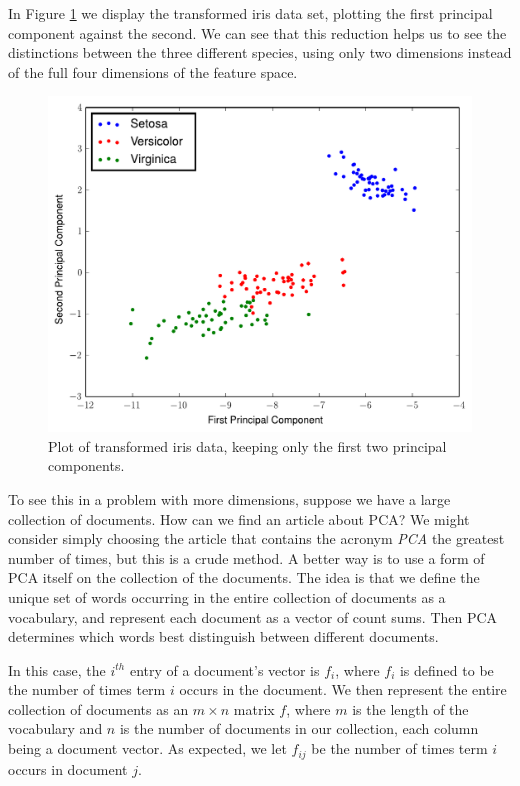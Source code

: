 In Figure \ref{fig:iris_pca} we display the transformed iris data set, plotting the first principal component against the second. We can see that this reduction helps us to see the distinctions between the three different species, using only two dimensions instead of the full four dimensions of the feature space.
\begin{figure}
\includegraphics[width=\textwidth]{iris_pca.pdf}
\caption{Plot of transformed iris data, keeping only the first two principal components.}
\label{fig:iris_pca}
\end{figure}

To see this in a problem with more dimensions, suppose we have a large collection of documents. How can we find an article about PCA? We might consider simply choosing the article that contains the acronym \emph{PCA} the greatest number of times, but this is a crude method. A better way is to use a form of PCA itself on the collection of the documents. The idea is that we define the unique set of words occurring in the entire collection of documents as a vocabulary, and represent each document as a vector of count sums. Then PCA determines which words best distinguish between different documents.

In this case, the $i^{th}$ entry of a document's vector is $f_{i}$, where $f_{i}$ is defined to be the number of times term $i$ occurs in the document. We then represent the entire collection of documents as an $m \times n$ matrix $f$, where $m$ is the length of the vocabulary and $n$ is the number of documents in our collection, each column being a document vector. As expected, we let $f_{ij}$ be the number of times term $i$ occurs in document $j$.

